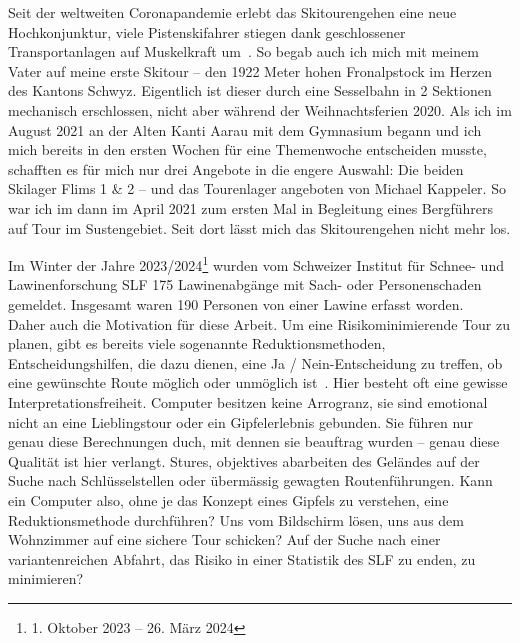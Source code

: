 


Seit der weltweiten Coronapandemie erlebt das Skitourengehen eine neue Hochkonjunktur, viele Pistenskifahrer stiegen dank geschlossener Transportanlagen auf Muskelkraft um~\cite{sacCoronaTrend}. So begab auch ich mich mit meinem Vater auf meine erste Skitour – den 1922 Meter hohen Fronalpstock im Herzen des Kantons Schwyz. Eigentlich ist dieser durch eine Sesselbahn in 2 Sektionen mechanisch erschlossen, nicht aber während der Weihnachtsferien 2020.
Als ich im August 2021 an der Alten Kanti Aarau mit dem Gymnasium begann und ich mich bereits in den ersten Wochen für eine Themenwoche entscheiden musste, schafften es für mich nur drei Angebote in die engere Auswahl: Die beiden Skilager Flims 1 \& 2 – und das Tourenlager angeboten von Michael Kappeler. So war ich im dann im April 2021 zum ersten Mal in Begleitung eines Bergführers auf Tour im Sustengebiet. Seit dort lässt mich das Skitourengehen nicht mehr los.

Im Winter der Jahre 2023/2024\footnote{1. Oktober 2023 -- 26. März 2024} wurden vom Schweizer Institut für Schnee- und Lawinenforschung SLF 175 Lawinenabgänge mit Sach- oder Personenschaden gemeldet. Insgesamt waren 190 Personen von einer Lawine erfasst worden.~\cite{slfWinterbericht202324}
\vfill\null
Daher auch die Motivation für diese Arbeit. Um eine Risikominimierende Tour zu planen, gibt es bereits viele sogenannte Reduktionsmethoden, Entscheidungshilfen, die dazu dienen, eine Ja / Nein-Entscheidung zu treffen, ob eine gewünschte Route möglich oder unmöglich ist~\cite{skitourenguruReduktionsmethoden}.
Hier besteht oft eine gewisse Interpretationsfreiheit. Computer besitzen keine Arrogranz, sie sind emotional nicht an eine Lieblingstour oder ein Gipfelerlebnis gebunden. Sie führen nur genau diese Berechnungen duch, mit dennen sie beauftrag wurden – genau diese Qualität ist hier verlangt. Stures, objektives abarbeiten des Geländes auf der Suche nach Schlüsselstellen oder übermässig gewagten Routenführungen. Kann ein Computer also, ohne je das Konzept eines Gipfels zu verstehen, eine Reduktionsmethode durchführen? Uns vom Bildschirm lösen, uns aus dem Wohnzimmer auf eine sichere Tour schicken? 
Auf der Suche nach einer variantenreichen Abfahrt, das Risiko in einer Statistik des SLF zu enden, zu minimieren?


